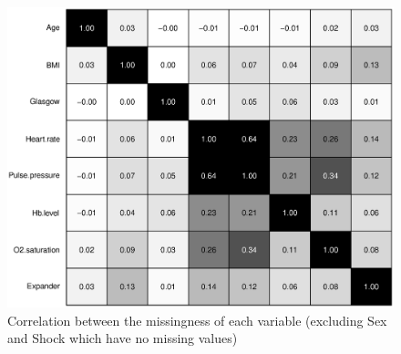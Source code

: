 \begin{figure}[H]
	\centering
   \includegraphics[scale=0.7]{Resources/cor_miss}
   \caption{Correlation between the missingness of each variable (excluding Sex and Shock which have no missing values)}
   \label{fig.cor_miss}
\end{figure}